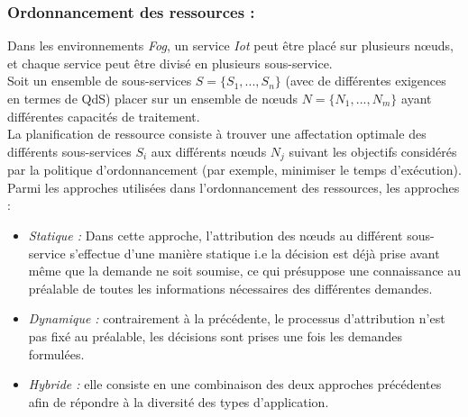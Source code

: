 \subsubsection{Ordonnancement des ressources :}
Dans les environnements \emph{Fog}, un service \emph{Iot} peut être placé sur plusieurs nœuds, et chaque service peut être divisé en plusieurs sous-service.\\ 
Soit un ensemble de sous-services $S=\{S_{1},...,S_{n}\}$ (avec de différentes exigences en termes de QdS) placer sur un ensemble de nœuds $N=\{N_{1},...,N_{m}\}$ ayant différentes capacités de traitement.\\
La planification de ressource consiste à trouver une affectation optimale des différents sous-services $S_{i}$ aux différents nœuds $N_{j}$ suivant les objectifs considérés par la politique d'ordonnancement (par exemple, minimiser le temps d'exécution).\\
Parmi les approches utilisées dans l'ordonnancement des ressources, les approches : 
\begin{itemize}
  \item \emph{Statique :} Dans cette approche, l'attribution des nœuds au différent sous-service s’effectue d’une manière statique i.e la décision est déjà prise avant même que la demande ne soit soumise, ce qui présuppose une connaissance au préalable de toutes les informations nécessaires des différentes demandes.
  \item \emph{Dynamique :} contrairement à la précédente, le processus d’attribution  n’est pas fixé au préalable, les décisions sont prises une fois les demandes formulées.
  \item \emph{Hybride :} elle consiste en une combinaison des deux approches précédentes afin de répondre à la diversité des types d’application. 
\end{itemize}
